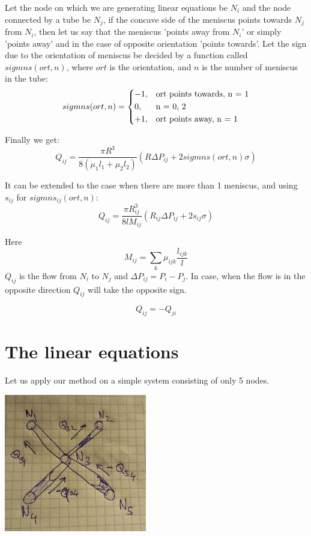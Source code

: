 \documentclass[12pt, a4paper]{article}
\begin{document}
Let the node on which we are generating linear equations be $N_i$ and the node connected by a tube be $N_j$, if the concave side of the meniscus points towards $N_j$ from $N_i$, then let us say that the meniscus 'points away from $N_i$' or simply 'points away' and in the case of opposite orientation 'points towards'. Let the sign due to the orientation of meniscus be decided by a function called $sigmns(ort, n)$, where $ort$ is the orientation, and $n$ is the number of meniscus in the tube:
\begin{equation}
sigmns(ort, n) = 
\begin{dcases}
-1,&\text{ort points towards, n = 1}\\
0,&\text{n = 0, 2}\\
+1,&\text{ort points away, n = 1}
\end{dcases}
\end{equation}

Finally we get:
\begin{equation} 
Q_{ij} = \frac{\pi R^3}{8({\mu}_1 l_1 + {\mu}_2 l_2)}(R\Delta P_{ij} + 2sigmns(ort, n)\sigma)
\end{equation}

It can be extended to the case when there are more than 1 meniscus, and using $s_{ij}$ for $sigmns_{ij}(ort, n)$:
\begin{equation} \label{eq:flow-rate-main}
\boxed{Q_{ij} = \frac{\pi R_{ij}^3}{8lM_{ij}}(R_{ij}\Delta P_{ij} + 2s_{ij}\sigma)}
\end{equation}

Here
\[ M_{ij} = \sum\limits_{k}{\mu}_{ijk} \frac{l_{ijk}}{l} \]
$Q_{ij}$ is the flow from $N_i$ to $N_j$ and $\Delta P_{ij} = P_i - P_j$. In case, when the flow is in the opposite direction $Q_{ij}$ will take the opposite sign.

\begin{equation}
Q_{ij} = -Q_{ji}
\end{equation}


\section{The linear equations} \label{sec:linear-equ}

Let us apply our method on a simple system consisting of only 5 nodes.

\includegraphics[height=6cm]{fig_simple-5-nodes}
\end{document}
